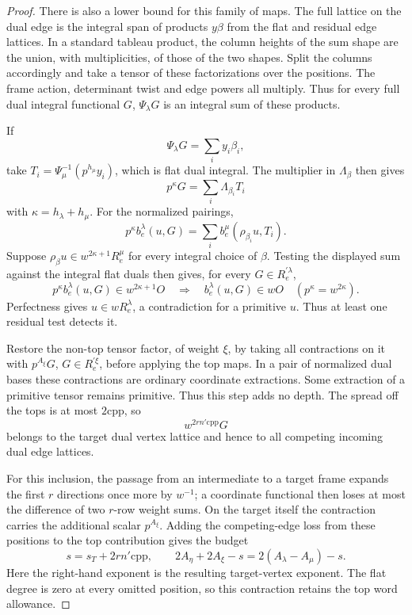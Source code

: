 \begin{proof}
There is also a lower bound for this family of maps. The full
lattice on the dual edge is the integral span of products
\(y\beta\) from the flat and residual edge lattices. In a standard
tableau product, the column heights of the sum shape are the
union, with multiplicities, of those of the two shapes. Split
the columns accordingly and take a tensor of these factorizations
over the positions. The frame action, determinant twist and
edge powers all multiply. Thus for every full dual integral
functional \(G\), \(\Psi_\lambda G\) is an integral sum of these
products.

If
\[
 \Psi_\lambda G=\sum_i y_i\beta_i,
\]
take
\(T_i=\Psi_\mu^{-1}(p^{h_\mu}y_i)\), which is flat
dual integral. The multiplier in \(\Lambda_\beta\) then gives
\[
 p^\kappa G=\sum_i\Lambda_{\beta_i} T_i
\]
with
\(\kappa=h_\lambda+h_\mu\). For the normalized pairings,
\[
 p^\kappa b_e^\lambda(u,G)
       =\sum_i b_e^\mu(\rho_{\beta_i}u,T_i).
\]
Suppose \(\rho_\beta u\in w^{2\kappa+1}R_e^\mu\) for every
integral choice of \(\beta\). Testing the displayed sum against the
integral flat duals then gives, for every \(G\in R_e^{\prime\lambda}\),
\[
 p^\kappa b_e^\lambda(u,G)\in w^{2\kappa+1}O
 \quad\Longrightarrow\quad b_e^\lambda(u,G)\in wO
 \quad(p^\kappa=w^{2\kappa}).
\]
Perfectness gives \(u\in w R_e^\lambda\), a contradiction for a
primitive \(u\). Thus at least one residual test detects it.

Restore the non-top tensor factor, of weight \(\xi\), by taking
all contractions on it with \(p^{A_\xi}G\),
\(G\in R_e^{\prime\xi}\), before applying the top maps.
In a pair of normalized dual bases these contractions are
ordinary coordinate extractions. Some extraction of a primitive
tensor remains primitive. Thus this step adds no depth. The
spread off the tops is at most \(2\mathrm{cpp}\), so
\[
 w^{2rn'\mathrm{cpp}}G
\]
belongs to the target dual vertex
lattice and hence to all competing incoming dual edge lattices.

For this inclusion, the passage from an intermediate to a target
frame expands the first \(r\) directions once more by \(w^{-1}\);
a coordinate functional then loses at most the difference of two
\(r\)-row weight sums. On the target itself the contraction
carries the additional scalar \(p^{A_\xi}\). Adding the competing-edge loss from these positions to the
top contribution gives the budget
\[
 s=s_T+2rn'\mathrm{cpp},\qquad
 2A_\eta+2A_\xi-s=2(A_\lambda-A_\mu)-s .
\]
Here the right-hand exponent is the resulting target-vertex exponent.
The flat
degree is zero at every omitted position, so this contraction
retains the top word allowance.


\end{proof}
